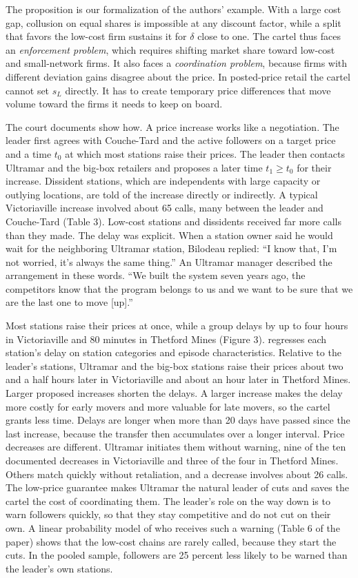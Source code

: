 The proposition is our formalization of the authors' example. With a large cost gap, collusion on equal shares is
impossible at any discount factor, while a split that favors the low-cost firm sustains it for $\delta$ close to one. The
cartel thus faces an \emph{enforcement problem}, which requires shifting market share toward low-cost and small-network
firms. It also faces a \emph{coordination problem}, because firms with different deviation gains disagree about the price.
In posted-price retail the cartel cannot set $s_L$ directly. It has to create temporary price differences that move volume
toward the firms it needs to keep on board.

The court documents show how. A price increase works like a negotiation. The leader first agrees with Couche-Tard and the
active followers on a target price and a time $t_0$ at which most stations raise their prices. The leader then contacts
Ultramar and the big-box retailers and proposes a later time $t_1\ge t_0$ for their increase. Dissident stations, which are
independents with large capacity or outlying locations, are told of the increase directly or indirectly. A typical
Victoriaville increase involved about 65 calls, many between the leader and Couche-Tard (Table 3). Low-cost stations and
dissidents received far more calls than they made. The delay was explicit. When a station owner said he would wait for the
neighboring Ultramar station, Bilodeau replied: ``I know that, I'm not worried, it's always the same thing.'' An Ultramar
manager described the arrangement in these words. ``We built the system seven years ago, the competitors know that the program
belongs to us and we want to be sure that we are the last one to move [up].''

Most stations raise their prices at once, while a group delays by up to four hours in Victoriaville and 80 minutes in Thetford
Mines (Figure 3).  regresses each station's delay on station categories and episode characteristics.
Relative to the leader's stations, Ultramar and the big-box stations raise their prices about two and a half hours later in
Victoriaville and about an hour later in Thetford Mines. Larger proposed increases shorten the delays. A larger increase makes
the delay more costly for early movers and more valuable for late movers, so the cartel grants less time. Delays are longer when
more than 20 days have passed since the last increase, because the transfer then accumulates over a longer interval. Price
decreases are different. Ultramar initiates them without warning, nine of the ten documented decreases in Victoriaville and three
of the four in Thetford Mines. Others match quickly without retaliation, and a decrease involves about 26 calls. The low-price
guarantee makes Ultramar the natural leader of cuts and saves the cartel the cost of coordinating them. The leader's role on
the way down is to warn followers quickly, so that they stay competitive and do not cut on their own. A linear probability
model of who receives such a warning (Table 6 of the paper) shows that the low-cost chains are rarely called, because they
start the cuts. In the pooled sample, followers are 25 percent less likely to be warned than the leader's own stations.

